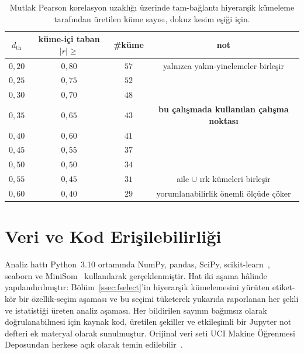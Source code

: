 \documentclass{ieeeaccess}
\begin{document}
\begin{table}[!t]
\caption{Mutlak Pearson korelasyon uzaklığı üzerinde tam-bağlantı hiyerarşik kümeleme tarafından üretilen küme sayısı, dokuz kesim eşiği için.}
\label{tab:sweep}
\centering
\small
\begin{tabular}{cccc}
\toprule
$d_{\mathrm{th}}$ & küme-içi taban $|r|\geq$ & \#küme & not \\
\midrule
$0{,}20$ & $0{,}80$ & $57$ & yalnızca yakın-yinelemeler birleşir \\
$0{,}25$ & $0{,}75$ & $52$ & \\
$0{,}30$ & $0{,}70$ & $48$ & \\
$0{,}35$ & $0{,}65$ & $43$ & \textbf{bu çalışmada kullanılan çalışma noktası} \\
$0{,}40$ & $0{,}60$ & $41$ & \\
$0{,}45$ & $0{,}55$ & $37$ & \\
$0{,}50$ & $0{,}50$ & $34$ & \\
$0{,}55$ & $0{,}45$ & $31$ & aile $\cup$ ırk kümeleri birleşir \\
$0{,}60$ & $0{,}40$ & $29$ & yorumlanabilirlik önemli ölçüde çöker \\
\bottomrule
\end{tabular}
\end{table}

\section{Veri ve Kod Erişilebilirliği}
\label{app:repro}
Analiz hattı Python~3.10 ortamında NumPy, pandas, SciPy, scikit-learn~\cite{pedregosa}, seaborn ve MiniSom~\cite{minisom} kullanılarak gerçeklenmiştir. Hat iki aşama hâlinde yapılandırılmıştır: Bölüm~\ref{ssec:fselect}'in hiyerarşik kümelemesini yürüten etiket-kör bir özellik-seçim aşaması ve bu seçimi tüketerek yukarıda raporlanan her şekli ve istatistiği üreten analiz aşaması. Her bildirilen sayının bağımsız olarak doğrulanabilmesi için kaynak kod, üretilen şekiller ve etkileşimli bir Jupyter not defteri ek materyal olarak sunulmuştur. Orijinal veri seti UCI Makine Öğrenmesi Deposundan herkese açık olarak temin edilebilir~\cite{uciccrime}.
\end{document}
